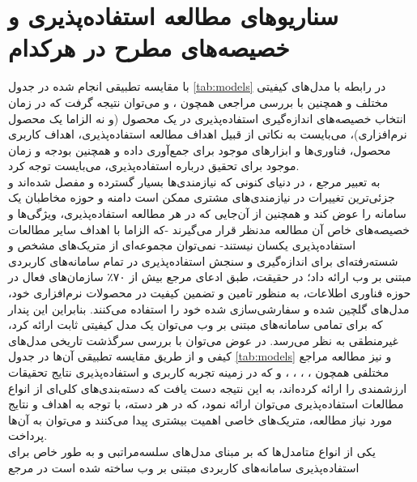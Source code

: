 \section{سناریوهای مطالعه استفاده‌پذیری و خصیصه‌های مطرح در هرکدام}
با مقایسه تطبیقی انجام شده در جدول
\ref{tab:models}
در رابطه با مدل‌های کیفیتی مختلف و همچنین با بررسی مراجعی همچون
\cite{wagner_software_2012}،
\cite{wagner_software_2013} و
\cite{albert_measuring_2013}
می‌توان نتیجه گرفت که در زمان انتخاب خصیصه‌های اندازه‌گیری استفاده‌پذیری در یک محصول (و نه الزاما یک محصول نرم‌افزاری)، می‌بایست به نکاتی از قبیل اهداف مطالعه استفاده‌پذیری، اهداف کاربری محصول، فناوری‌ها و ابزارهای موجود برای جمع‌آوری داده و همچنین بودجه و زمان موجود برای تحقیق درباره استفاده‌پذیری، می‌بایست توجه کرد.\\
به تعبیر مرجع
\cite{albert_measuring_2013}،
در دنیای کنونی که نیازمندی‌ها بسیار گسترده و مفصل شده‌اند و جزئی‌ترین تغییرات در نیازمندی‌های مشتری ممکن است دامنه و حوزه مخاطبان یک سامانه را عوض کند و همچنین از آن‌جایی که در هر مطالعه استفاده‌پذیری، ویژگی‌ها و خصیصه‌های خاص آن مطالعه مدنظر قرار می‌گیرند -که الزاما با اهداف سایر مطالعات استفاده‌پذیری یکسان نیستند- نمی‌توان مجموعه‌ای از متریک‌های مشخص و شسته‌رفته‌ای برای اندازه‌گیری و سنجش استفاده‌پذیری در تمام سامانه‌های کاربردی مبتنی بر وب ارائه داد؛‌
در حقیقت، طبق ادعای مرجع
\cite{wagner_software_2012}
بیش از ۷۰٪ سازمان‌های فعال در حوزه فناوری اطلاعات، به منظور تامین و تضمین کیفیت در محصولات نرم‌افزاری خود، مدل‌های گلچین شده و سفارشی‌سازی شده خود را استفاده می‌کنند. بنابراین این پندار که برای تمامی سامانه‌های مبتنی بر وب می‌توان یک مدل کیفیتی ثابت ارائه کرد، غیرمنطقی به نظر می‌رسد. در عوض می‌توان با بررسی سرگذشت تاریخی مدل‌های کیفی و از طریق مقایسه تطبیقی آن‌ها در جدول
\ref{tab:models}
و نیز مطالعه مراجع مختلفی همچون
\cite{alonso-rios_usability:_2009}،
\cite{bass_linking_2003}،
\cite{bevan_what_1991}،
\cite{pressman_software_2015}،
\cite{sommerville_software_2016}
و
\cite{albert_measuring_2013}
که در زمینه تجربه کاربری و استفاده‌پذیری نتایج تحقیقات ارزشمندی را ارائه کرده‌اند، به این نتیجه دست یافت که دسته‌بندی‌های کلی‌ای از انواع مطالعات استفاده‌پذیری می‌توان ارائه نمود، که در هر دسته، با توجه به اهداف و نتایج مورد نیاز مطالعه، متریک‌های خاصی اهمیت بیشتری پیدا می‌کنند و می‌توان به آن‌ها پرداخت.\\
یکی از انواع متامدل‌ها که بر مبنای مدل‌های سلسه‌مراتبی و به طور خاص برای استفاده‌پذیری سامانه‌های کاربردی مبتنی بر وب ساخته شده است در مرجع
